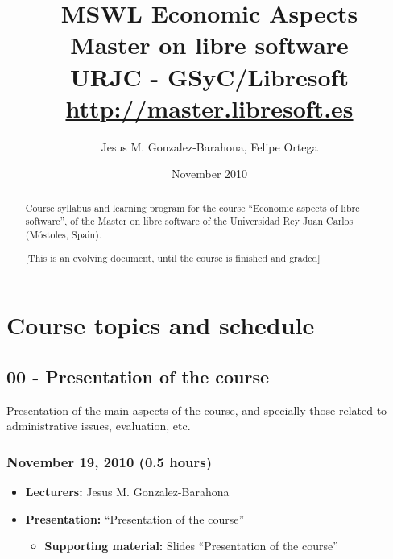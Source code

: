 \documentclass[a4paper]{article}
\title{MSWL Economic Aspects \\
Master on libre software \\
URJC - GSyC/Libresoft \\
\url{http://master.libresoft.es}}
\author{Jesus M. Gonzalez-Barahona, Felipe Ortega}
\date{November 2010}
\begin{document}
\maketitle

\begin{abstract}
Course syllabus and learning program for the course ``Economic aspects of libre software'', of the Master on libre software of the Universidad Rey Juan Carlos (Móstoles, Spain).

[This is an evolving document, until the course is finished and graded]
\end{abstract}

\tableofcontents

\section{Course topics and schedule}

\subsection{00 - Presentation of the course}

Presentation of the main aspects of the course, and specially those related to administrative issues, evaluation, etc.

\subsubsection{November 19, 2010 (0.5 hours)}

\begin{itemize}
\item \textbf{Lecturers:} Jesus M. Gonzalez-Barahona
\item \textbf{Presentation:} ``Presentation of the course''
  \begin{itemize}
  \item \textbf{Supporting material:} Slides ``Presentation of the course''
  \end{itemize}
\end{itemize}

\end{document}
